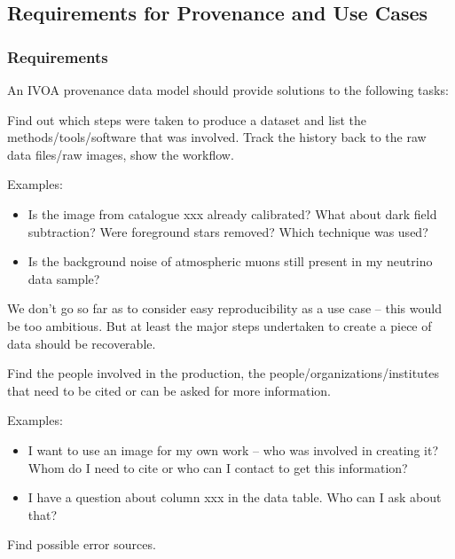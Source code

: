 \subsection{Requirements for Provenance and Use Cases}
\subsubsection{Requirements}\label{sec:requirements}

An IVOA provenance data model should provide solutions to the following tasks:

        Find out which steps were taken to produce a dataset and list the methods/tools/software that was involved. 
        Track the history back to the raw data files/raw images, show the workflow.

        \noindent Examples: 
        \begin{itemize}
            \item Is the image from catalogue xxx already calibrated?
What about dark field subtraction? Were foreground stars removed? Which technique
was used?  
            
            \item Is the background noise of atmospheric muons still present in my neutrino data sample?  
        \end{itemize}

        We don't go so far as to consider easy reproducibility as a use case -- this would be too ambitious. But at least the 
        major steps undertaken to create a piece of data should be recoverable.

      
        Find the people involved in the production, the people/organizations/institutes that need to be cited or can be asked for more information.

        \noindent Examples: 
        \begin{itemize}
            \item I want to use an image for my own work -- who was involved in
creating it? Whom do I need to cite or who can I contact to get this information?  
            \item I have a question about column xxx in the data
table. Who can I ask about that?  
        \end{itemize}
      

        Find possible error sources.

